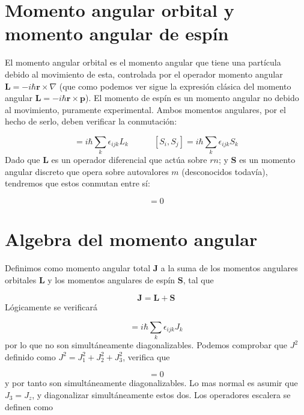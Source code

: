 \documentclass[12pt]{book}
\numberwithin{equation}{chapter}
\numberwithin{figure}{chapter}
\newcommand{\tquad}{\quad \quad \quad}
\newcommand{\rn}{\mathbf{r}}
\newcommand{\pn}{\mathbf{p}}
\newcommand{\Sn}{\mathbf{S}}
\newcommand{\Ln}{\mathbf{L}}
\newcommand{\Jn}{\mathbf{J}}
\begin{document}
\section{Momento angular orbital y momento angular de espín}

El momento angular orbital es el momento angular que tiene una partícula debido al movimiento de esta, controlada por el operador momento angular $\Ln = - i \hbar \rn \times \nabla$ (que como podemos ver sigue la expresión clásica del momento angular $\Ln=-i\hbar \rn \times \pn$). El momento de espín es un momento angular no debido al movimiento, puramente experimental. Ambos momentos angulares, por el hecho de serlo, deben verificar la conmutación:

\begin{equation}
[L_i,L_j]=i \hbar \sum_k \epsilon_{ijk} L_k \tquad
[S_i,S_j]=i \hbar \sum_k \epsilon_{ijk} S_k
\end{equation}
Dado que $\Ln$ es un operador diferencial que actúa sobre $rn$; y $\Sn$ es un momento angular discreto que opera sobre autovalores $m$ (desconocidos todavía), tendremos que estos conmutan entre sí:

\begin{equation}
[L_i,S_j] = 0
\end{equation}

\section{Algebra  del momento angular}

Definimos como momento angular total $\Jn$ a la suma de los momentos angulares orbitales $\Ln$ y los momentos angulares de espín $\Sn$, tal que

\begin{equation}
\Jn = \Ln + \Sn
\end{equation}
Lógicamente se verificará 

\begin{equation}
[J_i,J_j] = i \hbar \sum_k \epsilon_{ijk} J_k
\end{equation}
por lo que no son simultáneamente diagonalizables. Podemos comprobar que $J^2$ definido como $J^2 = J_1^2+J_2^2+J_3^2$, verifica que

\begin{equation}
[J^2,J_i]=0
\end{equation}
y por tanto son simultáneamente diagonalizables. Lo mas normal es asumir que $J_3=J_z$, y diagonalizar simultáneamente estos dos. Los operadores escalera se definen como
\end{document}
